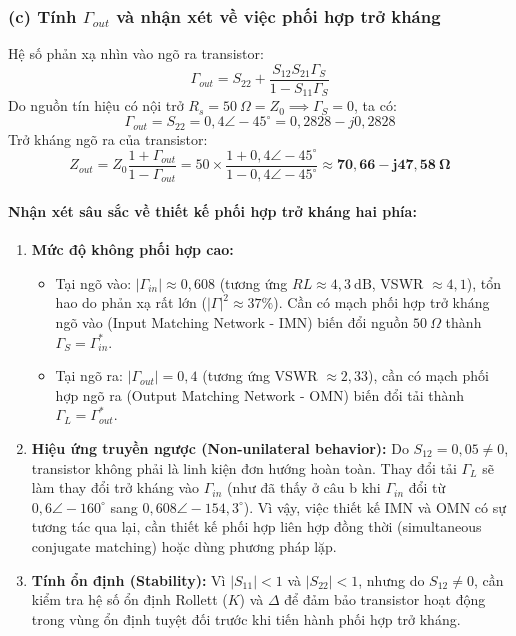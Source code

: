 \documentclass[12pt,a4paper]{article}
\begin{document}
\subsubsection{(c) Tính $\Gamma_{out}$ và nhận xét về việc phối hợp trở kháng}
Hệ số phản xạ nhìn vào ngõ ra transistor:
\[
\Gamma_{out} = S_{22} + \frac{S_{12}S_{21}\Gamma_S}{1 - S_{11}\Gamma_S}
\]
Do nguồn tín hiệu có nội trở $R_s = 50~\Omega = Z_0 \implies \Gamma_S = 0$, ta có:
\[
\boxed{\Gamma_{out} = S_{22} = 0{,}4 \angle -45^\circ = 0{,}2828 - j0{,}2828}
\]
Trở kháng ngõ ra của transistor:
\[
Z_{out} = Z_0 \frac{1 + \Gamma_{out}}{1 - \Gamma_{out}} = 50 \times \frac{1 + 0{,}4\angle -45^\circ}{1 - 0{,}4\angle -45^\circ} \approx \mathbf{70{,}66 - j47{,}58~\Omega}
\]

\paragraph{Nhận xét sâu sắc về thiết kế phối hợp trở kháng hai phía:}
\begin{enumerate}
    \item \textbf{Mức độ không phối hợp cao:} 
    \begin{itemize}
        \item Tại ngõ vào: $|\Gamma_{in}| \approx 0{,}608$ (tương ứng $RL \approx 4{,}3~\text{dB}$, VSWR $\approx 4{,}1$), tổn hao do phản xạ rất lớn ($|\Gamma|^2 \approx 37\%$). Cần có mạch phối hợp trở kháng ngõ vào (Input Matching Network - IMN) biến đổi nguồn $50~\Omega$ thành $\Gamma_S = \Gamma_{in}^*$.
        \item Tại ngõ ra: $|\Gamma_{out}| = 0{,}4$ (tương ứng VSWR $\approx 2{,}33$), cần có mạch phối hợp ngõ ra (Output Matching Network - OMN) biến đổi tải thành $\Gamma_L = \Gamma_{out}^*$.
    \end{itemize}
    \item \textbf{Hiệu ứng truyền ngược (Non-unilateral behavior):}
    Do $S_{12} = 0{,}05 \neq 0$, transistor không phải là linh kiện đơn hướng hoàn toàn. Thay đổi tải $\Gamma_L$ sẽ làm thay đổi trở kháng vào $\Gamma_{in}$ (như đã thấy ở câu b khi $\Gamma_{in}$ đổi từ $0{,}6\angle -160^\circ$ sang $0{,}608\angle -154{,}3^\circ$). Vì vậy, việc thiết kế IMN và OMN có sự tương tác qua lại, cần thiết kế phối hợp liên hợp đồng thời (simultaneous conjugate matching) hoặc dùng phương pháp lặp.
    \item \textbf{Tính ổn định (Stability):}
    Vì $|S_{11}| < 1$ và $|S_{22}| < 1$, nhưng do $S_{12} \neq 0$, cần kiểm tra hệ số ổn định Rollett ($K$) và $\Delta$ để đảm bảo transistor hoạt động trong vùng ổn định tuyệt đối trước khi tiến hành phối hợp trở kháng.
\end{enumerate}
\end{document}
